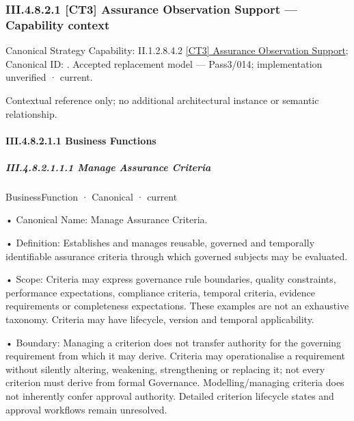 \subsubsection*{III.4.8.2.1 [CT3] Assurance Observation Support — Capability context}
\label{navigation:III.4.8.2.1}

{\small Canonical Strategy Capability: II.1.2.8.4.2 \hyperref[element:48bb094dd2494228935c91551b149097]{[CT3] Assurance Observation Support}; Canonical ID: \texttt{}. Accepted replacement model — Pass3/014; implementation unverified · current.}\par
Contextual reference only; no additional architectural instance or semantic relationship.\par
\paragraph*{III.4.8.2.1.1 Business Functions}
\label{navigation:III.4.8.2.1.1}

\subparagraph*{III.4.8.2.1.1.1 Manage Assurance Criteria}
\label{navigation:III.4.8.2.1.1.1}

\label{element:d7e9ba5addd94db2bce164c7c9809e4e}
{\small BusinessFunction · Canonical · current}\par

•
Canonical Name: Manage Assurance Criteria.



•
Definition: Establishes and manages reusable, governed and temporally identifiable assurance criteria through which governed subjects may be evaluated.



•
Scope: Criteria may express governance rule boundaries, quality constraints, performance expectations, compliance criteria, temporal criteria, evidence requirements or completeness expectations. These examples are not an exhaustive taxonomy. Criteria may have lifecycle, version and temporal applicability.



•
Boundary: Managing a criterion does not transfer authority for the governing requirement from which it may derive. Criteria may operationalise a requirement without silently altering, weakening, strengthening or replacing it; not every criterion must derive from formal Governance. Modelling/managing criteria does not inherently confer approval authority. Detailed criterion lifecycle states and approval workflows remain unresolved.



